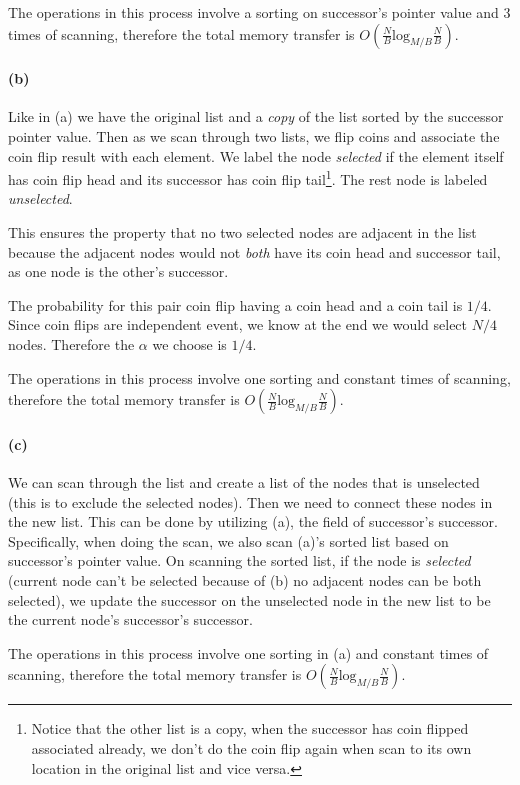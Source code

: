 \documentclass[12pt]{article}
\begin{document}
The operations in this process involve a sorting on successor's pointer value and 3 times of scanning, therefore the total memory transfer is $O(\frac{N}{B}\text{log}_{M/B}\frac{N}{B})$. 

\paragraph{(b)} Like in (a) we have the original list and a \emph{copy} of the list sorted by the successor pointer value. Then as we scan through two lists, we flip coins and associate the coin flip result with each element. We label the node \emph{selected} if the element itself has coin flip head and its successor has coin flip tail\footnote{Notice that the other list is a copy, when the successor has coin flipped associated already, we don't do the coin flip again when scan to its own location in the original list and vice versa.}. The rest node is labeled \emph{unselected}. 

This ensures the property that no two selected nodes are adjacent in the list because the adjacent nodes would not \emph{both} have its coin head and successor tail, as one node is the other's successor. 

The probability for this pair coin flip having a coin head and a coin tail is $1/4$. Since coin flips are independent event, we know at the end we would select $N/4$ nodes. Therefore the $\alpha$ we choose is $1/4$.

The operations in this process involve one sorting and constant times of scanning, therefore the total memory transfer is $O(\frac{N}{B}\text{log}_{M/B}\frac{N}{B})$. 

\paragraph{(c)} We can scan through the list and create a list of the nodes that is unselected (this is to exclude the selected nodes). Then we need to connect these nodes in the new list. This can be done by utilizing (a), the field of successor's successor. Specifically, when doing the scan, we also scan (a)'s sorted list based on successor's pointer value. On scanning the sorted list, if the node is \emph{selected} (current node can't be selected because of (b) no adjacent nodes can be both selected), we update the successor on the unselected node in the new list to be the current node's successor's successor. 

The operations in this process involve one sorting in (a) and constant times of scanning, therefore the total memory transfer is $O(\frac{N}{B}\text{log}_{M/B}\frac{N}{B})$. 
\end{document}
